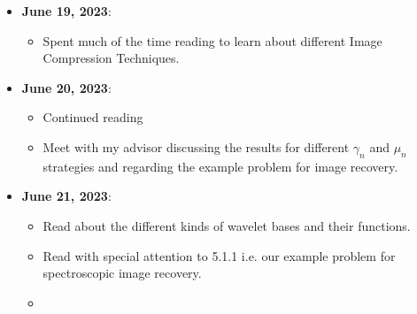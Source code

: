 \documentclass[a4paper,11pt,fleqn]{article}
\theoremstyle{plain}{\theorembodyfont{\rmfamily}%
\newtheorem{conjecture}[theorem]{Conjecture}}
\theoremstyle{plain}{\theorembodyfont{\rmfamily}%
\newtheorem{example}[theorem]{Example}}
\theoremstyle{plain}{\theorembodyfont{\rmfamily}%
\newtheorem{remark}[theorem]{Remark}}
\theoremstyle{plain}{\theorembodyfont{\rmfamily}%
\newtheorem{algorithm}[theorem]{Algorithm}}
\theoremstyle{plain}{\theorembodyfont{\rmfamily}%
\newtheorem{condition}[theorem]{Condition}}
\theoremstyle{plain}{\theorembodyfont{\rmfamily}%
\newtheorem{definition}[theorem]{Definition}}
\theoremstyle{plain}{\theorembodyfont{\rmfamily}
\newtheorem{fact}[theorem]{Fact}}
\theoremstyle{plain}{\theorembodyfont{\rmfamily}
\newtheorem{problem}[theorem]{Problem}}
\theoremstyle{plain}{\theorembodyfont{\rmfamily}
\newtheorem{notation}[theorem]{Notation}}
\theoremstyle{plain}{\theorembodyfont{\rmfamily}
\newtheorem{project}[theorem]{Project}}
\begin{document}
\begin{itemize}
\item {\bf June 19, 2023}:
\begin{itemize} 
\item Spent much of the time reading \cite{ImageCompressionHussain} to learn about different Image Compression Techniques.
\end{itemize}

\item {\bf June 20, 2023}:
\begin{itemize} 
\item Continued reading \cite{ImageCompressionHussain}
\item Meet with my advisor discussing the results for different $\gamma_n$ and $\mu_n$ strategies and regarding the example problem for image recovery.
\end{itemize}

\item {\bf June 21, 2023}:
\begin{itemize} 
\item Read about the different kinds of wavelet bases and their functions.
\item Read \cite{ImageRecoveryPCombettes} with special attention to 5.1.1 i.e. our example problem for spectroscopic image recovery.
\item 
\end{itemize}

\end{itemize}



\end{document}
